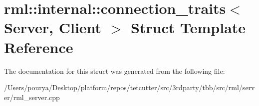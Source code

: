 \hypertarget{structrml_1_1internal_1_1connection__traits}{}\section{rml\+:\+:internal\+:\+:connection\+\_\+traits$<$ Server, Client $>$ Struct Template Reference}
\label{structrml_1_1internal_1_1connection__traits}


The documentation for this struct was generated from the following file\+:\begin{DoxyCompactItemize}
\item 
/\+Users/pourya/\+Desktop/platform/repos/tetcutter/src/3rdparty/tbb/src/rml/server/rml\+\_\+server.\+cpp\end{DoxyCompactItemize}
